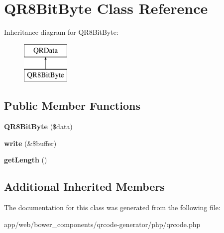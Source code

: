 \hypertarget{class_q_r8_bit_byte}{}\section{Q\+R8\+Bit\+Byte Class Reference}
\label{class_q_r8_bit_byte}
Inheritance diagram for Q\+R8\+Bit\+Byte\+:\begin{figure}[H]
\begin{center}
\leavevmode
\includegraphics[height=2.000000cm]{class_q_r8_bit_byte}
\end{center}
\end{figure}
\subsection*{Public Member Functions}
\begin{DoxyCompactItemize}
\item 
\mbox{\label{class_q_r8_bit_byte_a1758ac4c3943c474f1b048ec8621e476}} 
{\bfseries Q\+R8\+Bit\+Byte} (\$data)
\item 
\mbox{\label{class_q_r8_bit_byte_ae4b94bd18393c8eaf783b8199bd5285c}} 
{\bfseries write} (\&\$buffer)
\item 
\mbox{\label{class_q_r8_bit_byte_a20af35559016e2effec7a6bf51254ee0}} 
{\bfseries get\+Length} ()
\end{DoxyCompactItemize}
\subsection*{Additional Inherited Members}


The documentation for this class was generated from the following file\+:\begin{DoxyCompactItemize}
\item 
app/web/bower\+\_\+components/qrcode-\/generator/php/qrcode.\+php\end{DoxyCompactItemize}
